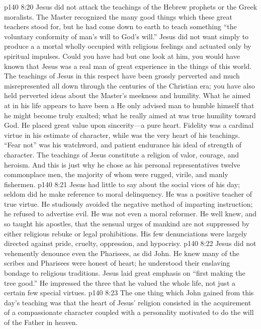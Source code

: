 \vs p140 8:20 Jesus did not attack the teachings of the Hebrew prophets or the Greek moralists. The Master recognized the many good things which these great teachers stood for, but he had come down to earth to teach something  “the voluntary conformity of man’s will to God’s will.” Jesus did not want simply to produce a  a mortal wholly occupied with religious feelings and actuated only by spiritual impulses. Could you have had but one look at him, you would have known that Jesus was a real man of great experience in the things of this world. The teachings of Jesus in this respect have been grossly perverted and much misrepresented all down through the centuries of the Christian era; you have also held perverted ideas about the Master’s meekness and humility. What he aimed at in his life appears to have been a  He only advised man to humble himself that he might become truly exalted; what he really aimed at was true humility toward God. He placed great value upon sincerity---a pure heart. Fidelity was a cardinal virtue in his estimate of character, while  was the very heart of his teachings. \textcolor{ubdarkred}{“Fear not”} was his watchword, and patient endurance his ideal of strength of character. The teachings of Jesus constitute a religion of valor, courage, and heroism. And this is just why he chose as his personal representatives twelve commonplace men, the majority of whom were rugged, virile, and manly fishermen.
\vs p140 8:21 Jesus had little to say about the social vices of his day; seldom did he make reference to moral delinquency. He was a positive teacher of true virtue. He studiously avoided the negative method of imparting instruction; he refused to advertise evil. He was not even a moral reformer. He well knew, and so taught his apostles, that the sensual urges of mankind are not suppressed by either religious rebuke or legal prohibitions. His few denunciations were largely directed against pride, cruelty, oppression, and hypocrisy.
\vs p140 8:22 Jesus did not vehemently denounce even the Pharisees, as did John. He knew many of the scribes and Pharisees were honest of heart; he understood their enslaving bondage to religious traditions. Jesus laid great emphasis on \textcolor{ubdarkred}{“first making the tree good.”} He impressed the three that he valued the whole life, not just a certain few special virtues.
\pc \vs p140 8:23 The one thing which John gained from this day’s teaching was that the heart of Jesus’ religion consisted in the acquirement of a compassionate character coupled with a personality motivated to do the will of the Father in heaven.
